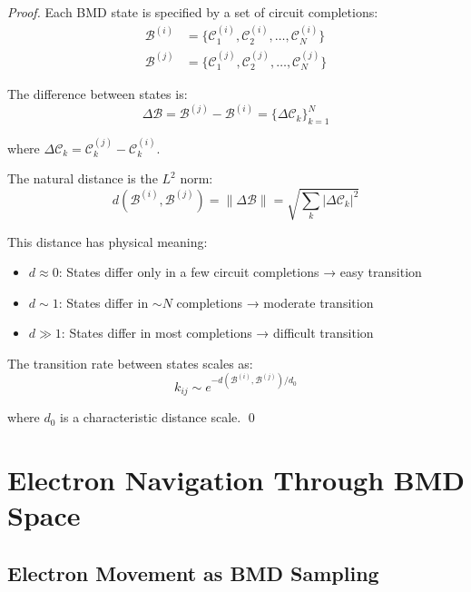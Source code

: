 \documentclass[12pt,a4paper]{article}
\begin{document}
\begin{proof}
Each BMD state is specified by a set of circuit completions:
\begin{align}
\mathcal{B}^{(i)} &= \{\mathcal{C}_1^{(i)}, \mathcal{C}_2^{(i)}, \ldots, \mathcal{C}_N^{(i)}\} \\
\mathcal{B}^{(j)} &= \{\mathcal{C}_1^{(j)}, \mathcal{C}_2^{(j)}, \ldots, \mathcal{C}_N^{(j)}\}
\end{align}

The difference between states is:
\begin{equation}
\Delta\mathcal{B} = \mathcal{B}^{(j)} - \mathcal{B}^{(i)} = \{\Delta\mathcal{C}_k\}_{k=1}^{N}
\end{equation}

where $\Delta\mathcal{C}_k = \mathcal{C}_k^{(j)} - \mathcal{C}_k^{(i)}$.

The natural distance is the $L^2$ norm:
\begin{equation}
d(\mathcal{B}^{(i)}, \mathcal{B}^{(j)}) = \|\Delta\mathcal{B}\| = \sqrt{\sum_{k} |\Delta\mathcal{C}_k|^2}
\end{equation}

This distance has physical meaning:
\begin{itemize}
\item $d \approx 0$: States differ only in a few circuit completions → easy transition
\item $d \sim 1$: States differ in $\sim N$ completions → moderate transition
\item $d \gg 1$: States differ in most completions → difficult transition
\end{itemize}

The transition rate between states scales as:
\begin{equation}
k_{ij} \sim e^{-d(\mathcal{B}^{(i)}, \mathcal{B}^{(j)}) / d_0}
\end{equation}

where $d_0$ is a characteristic distance scale. \qed
\end{proof}

\section{Electron Navigation Through BMD Space}

\subsection{Electron Movement as BMD Sampling}
\end{document}
